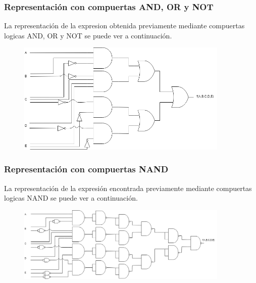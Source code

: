 \subsubsection{Representaci\'on con compuertas AND, OR y NOT}
\noindent
La representaci\'on de la expresion obtenida previamente mediante compuertas logicas AND, OR y NOT se puede ver a continuaci\'on.

\begin{figure}[h!]
    \centering
    \begin{minipage}{0.85\textwidth}
        \centering
        \includegraphics[width=0.9\textwidth]{images/ej2/ej2andornot.png} %
         \label{fig:ej2andornot}
    \end{minipage}\hfill
\end{figure}

\subsubsection{Representaci\'on con compuertas NAND}
\noindent
La representaci\'on de la expresi\'on encontrada previamente mediante compuertas logicas NAND se puede ver a continuaci\'on.

\begin{figure}[H]
    \centering
    \begin{minipage}{0.85\textwidth}
        \centering
        \includegraphics[width=0.9\textwidth]{images/ej2/ej2nand.png} %
         \label{fig:ej2nand}
    \end{minipage}\hfill
\end{figure}